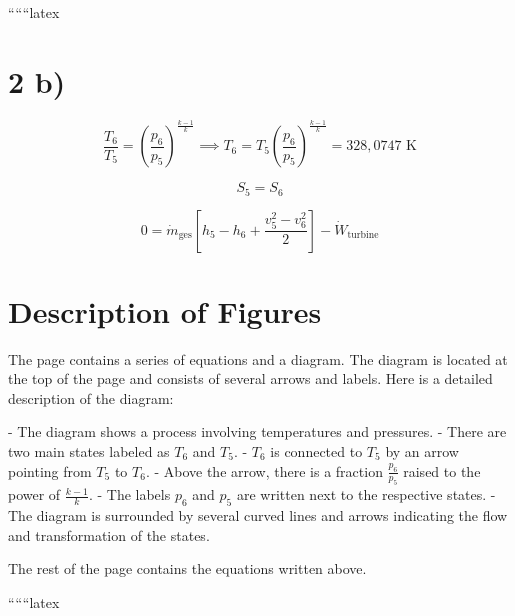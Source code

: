 ``````latex


\section*{2 b)}

\begin{equation*}
\frac{T_6}{T_5} = \left( \frac{p_6}{p_5} \right)^{\frac{k-1}{k}} \implies T_6 = T_5 \left( \frac{p_6}{p_5} \right)^{\frac{k-1}{k}} = \boxed{328,0747 \text{ K}}
\end{equation*}

\begin{equation*}
S_5 = S_6
\end{equation*}

\begin{equation*}
0 = \dot{m}_{\text{ges}} \left[ h_5 - h_6 + \frac{v_5^2 - v_6^2}{2} \right] - \dot{W}_{\text{turbine}}
\end{equation*}

\section*{Description of Figures}

The page contains a series of equations and a diagram. The diagram is located at the top of the page and consists of several arrows and labels. Here is a detailed description of the diagram:

- The diagram shows a process involving temperatures and pressures.
- There are two main states labeled as \( T_6 \) and \( T_5 \).
- \( T_6 \) is connected to \( T_5 \) by an arrow pointing from \( T_5 \) to \( T_6 \).
- Above the arrow, there is a fraction \(\frac{p_6}{p_5}\) raised to the power of \(\frac{k-1}{k}\).
- The labels \( p_6 \) and \( p_5 \) are written next to the respective states.
- The diagram is surrounded by several curved lines and arrows indicating the flow and transformation of the states.

The rest of the page contains the equations written above.

``````latex


